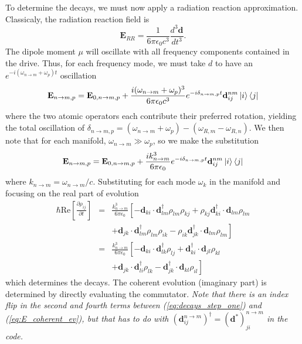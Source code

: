 \documentclass[final,5p,times,twocolumn]{elsarticle}
\begin{document}
To determine the decays, we must now apply a radiation reaction approximation.  Classicaly, the radiation reaction field is
\begin{equation}
	\mathbf{E}_{RR} = \frac{1}{6\pi\epsilon_0 c^3}\frac{d^3\mathbf{d}}{dt^3}.
\end{equation}
The dipole moment $\mu$ will oscillate with all frequency components contained in the drive.  Thus, for each frequency mode, we must take $d$ to have an $e^{-i (\omega_{n\rightarrow m}+\omega_p)t}$ oscillation
\begin{equation}
	\mathbf{E}_{n\rightarrow m,p} = \mathbf{E}_{0,n\rightarrow m,p} + \frac{i (\omega_{n\rightarrow m}+\omega_p)^3}{6\pi\epsilon_0c ^3}e^{-i\delta_{n\rightarrow m, p}t} \mathbf{d}^{nm}_{ij}\ket{i}\Bra{j}
\end{equation}
where the two atomic operators each contribute their preferred rotation, yielding the total oscillation of $\delta_{n\rightarrow m, p} = (\omega_{n\rightarrow m}+\omega_p)-(\omega_{R,m}-\omega_{R,n})$.
We then note that for each manifold, $\omega_{n\rightarrow m}\gg \omega_p$, so we make the substitution
\begin{equation}
	\mathbf{E}_{n\rightarrow m,p} = \mathbf{E}_{0,n\rightarrow m,p} + \frac{i k_{n\rightarrow m}^3}{6\pi\epsilon_0 }e^{-i\delta_{n\rightarrow m, p}t} \mathbf{d}^{nm}_{ij}\ket{i}\Bra{j}
\end{equation}
where $k_{n\rightarrow m} = \omega_{n\rightarrow m}/c$.  Substituting for each mode $\omega_k$ in the manifold and focusing on the real part of evolution
\begin{eqnarray}
	\hbar\text{Re}\left[\frac{\partial \rho_{ij}}{\partial t}\right] & = &  \frac{k_{n\rightarrow m}^3}{6\pi\epsilon_0}\left[
	-\mathbf{d}_{ki}\cdot \mathbf{d}^\dagger_{lm}\rho_{lm}\rho_{kj} 
	+\rho_{kj}\mathbf{d}_{ki}^\dagger \cdot \mathbf{d}_{lm}\rho_{lm}  \right. \nonumber \label{eq:decays_step_one} \\
	& & \left. + \mathbf{d}_{jk}\cdot \mathbf{d}^\dagger_{lm}\rho_{lm}\rho_{ik}
	- \rho_{ik}\mathbf{d}_{jk}^\dagger \cdot \mathbf{d}_{lm}\rho_{lm}
	\right] \\
	& = & \frac{k_{n\rightarrow m}^3}{6\pi\epsilon_0 }\left[
	-\mathbf{d}_{ki}\cdot \mathbf{d}^\dagger_{lk}\rho_{lj} 
	+ \mathbf{d}_{ki}^\dagger \cdot \mathbf{d}_{jl}\rho_{kl} \right. \nonumber \\
	& & \left. + \mathbf{d}_{jk}\cdot \mathbf{d}^\dagger_{li}\rho_{lk}
	- \mathbf{d}_{jk}^\dagger \cdot \mathbf{d}_{kl}\rho_{il} \right] \label{eq:decay}
\end{eqnarray}
which determines the decays.  The coherent evolution (imaginary part) is determined by directly evaluating the commutator. {\it Note that there is an index flip in the second and fourth terms between (\ref{eq:decays_step_one}) and (\ref{eq:E_coherent_ev}), but that has to do with $(\mathbf{d}^{n\rightarrow m}_{ij})^\dagger = (\mathbf{d}^*)^{n\rightarrow m}_{ji}$ in the code.}
\end{document}
